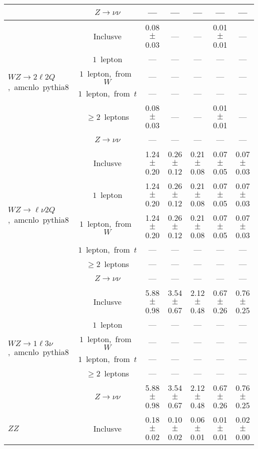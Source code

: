\documentclass{article}
\begin{document}
\begin{longtable}{|l|c|c|c|c|c|c|}
 & $Z\rightarrow\nu\nu$  & ---  & ---  & ---  & ---  & --- \\* 
\hline 
\multirow{6}{*}{$WZ{\rightarrow}2{\ell}2Q$,~amcnlo~pythia8} & Inclusve  & 0.08 $\pm$ 0.03  & ---  & ---  & 0.01 $\pm$ 0.01  & --- \\* 
 & $1$~lepton  & ---  & ---  & ---  & ---  & --- \\* 
 & $1$~lepton,~from~$W$  & ---  & ---  & ---  & ---  & --- \\* 
 & $1$~lepton,~from~$t$  & ---  & ---  & ---  & ---  & --- \\* 
 & $\ge2$~leptons  & 0.08 $\pm$ 0.03  & ---  & ---  & 0.01 $\pm$ 0.01  & --- \\* 
 & $Z\rightarrow\nu\nu$  & ---  & ---  & ---  & ---  & --- \\* 
\hline 
\multirow{6}{*}{$WZ{\rightarrow}{\ell}{\nu}2Q$,~amcnlo~pythia8} & Inclusve  & 1.24 $\pm$ 0.20  & 0.26 $\pm$ 0.12  & 0.21 $\pm$ 0.08  & 0.07 $\pm$ 0.05  & 0.07 $\pm$ 0.03 \\* 
 & $1$~lepton  & 1.24 $\pm$ 0.20  & 0.26 $\pm$ 0.12  & 0.21 $\pm$ 0.08  & 0.07 $\pm$ 0.05  & 0.07 $\pm$ 0.03 \\* 
 & $1$~lepton,~from~$W$  & 1.24 $\pm$ 0.20  & 0.26 $\pm$ 0.12  & 0.21 $\pm$ 0.08  & 0.07 $\pm$ 0.05  & 0.07 $\pm$ 0.03 \\* 
 & $1$~lepton,~from~$t$  & ---  & ---  & ---  & ---  & --- \\* 
 & $\ge2$~leptons  & ---  & ---  & ---  & ---  & --- \\* 
 & $Z\rightarrow\nu\nu$  & ---  & ---  & ---  & ---  & --- \\* 
\hline 
\multirow{6}{*}{$WZ{\rightarrow}1{\ell}3{\nu}$,~amcnlo~pythia8} & Inclusve  & 5.88 $\pm$ 0.98  & 3.54 $\pm$ 0.67  & 2.12 $\pm$ 0.48  & 0.67 $\pm$ 0.26  & 0.76 $\pm$ 0.25 \\* 
 & $1$~lepton  & ---  & ---  & ---  & ---  & --- \\* 
 & $1$~lepton,~from~$W$  & ---  & ---  & ---  & ---  & --- \\* 
 & $1$~lepton,~from~$t$  & ---  & ---  & ---  & ---  & --- \\* 
 & $\ge2$~leptons  & ---  & ---  & ---  & ---  & --- \\* 
 & $Z\rightarrow\nu\nu$  & 5.88 $\pm$ 0.98  & 3.54 $\pm$ 0.67  & 2.12 $\pm$ 0.48  & 0.67 $\pm$ 0.26  & 0.76 $\pm$ 0.25 \\* 
\hline 
\multirow{6}{*}{$ZZ$} & Inclusve  & 0.18 $\pm$ 0.02  & 0.10 $\pm$ 0.02  & 0.06 $\pm$ 0.01  & 0.01 $\pm$ 0.01  & 0.02 $\pm$ 0.00 \\* 

\end{longtable}
\end{document}
